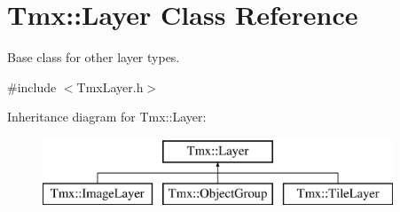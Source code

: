 \hypertarget{classTmx_1_1Layer}{\section{Tmx\-:\-:Layer Class Reference}
\label{classTmx_1_1Layer}
}


Base class for other layer types.  




{\ttfamily \#include $<$Tmx\-Layer.\-h$>$}

Inheritance diagram for Tmx\-:\-:Layer\-:\begin{figure}[H]
\begin{center}
\leavevmode
\includegraphics[height=2.000000cm]{classTmx_1_1Layer}
\end{center}
\end{figure}
